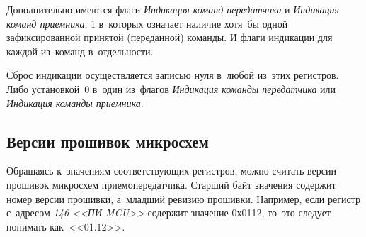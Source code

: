 Дополнительно имеются флаги \textit{Индикация команд передатчика} и \textit{Индикация команд приемника}, 1 в~которых означает наличие хотя~бы одной зафиксированной принятой (переданной) команды. И флаги индикации для каждой из~команд в~отдельности.

Сброс индикации осуществляется записью нуля в~любой из~этих регистров. Либо установкой~0 в~один из~флагов \textit{Индикация команды передатчика} или \textit{Индикация команды приемника}.
\fi

\subsection{Версии прошивок микросхем}

Обращаясь к~значениям соответствующих регистров, можно считать версии прошивок микросхем приемопередатчика. Старший байт значения содержит номер версии прошивки, а~младший ревизию прошивки. Например, если регистр с~адресом \textit{146 <<ПИ MCU>>} содержит значение 0х0112, то~это следует понимать как~<<01.12>>.